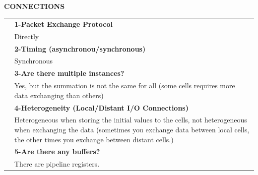 \newpage
{\large\textbf{ }}\vspace{10pt}\\
{\large\textbf{CONNECTIONS}}\vspace{10pt}\\\begin{tabular}{ p{0.2cm} p{14.5cm}}
&\textbf{1-Packet Exchange Protocol}\\
&Directly\vspace{7pt}\\
&\textbf{2-Timing (asynchronou/synchronous)}\\
&Synchronous\vspace{7pt}\\
&\textbf{3-Are there multiple instances? }\\
&Yes, but the summation is not the same for all (some cells requires more data exchanging than others)\vspace{7pt}\\
&\textbf{4-Heterogeneity (Local/Distant I/O Connections)}\\
&Heterogeneous when storing the initial values to the cells, not heterogeneous when exchanging the data (sometimes you exchange data between local cells, the other times you exchange between distant cells.)\vspace{7pt}\\
&\textbf{5-Are there any buffers?}\\
&There are pipeline registers.
\end{tabular}\vspace{14pt}\\
